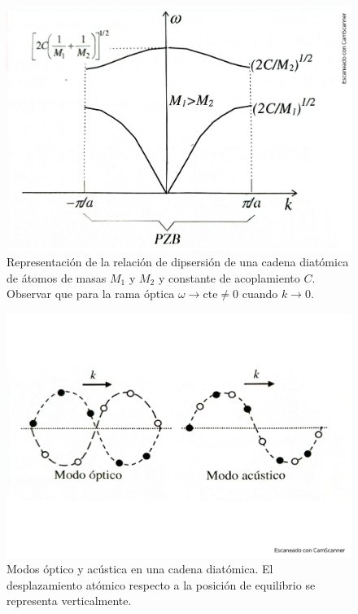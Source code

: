 \begin{figure}[h!] \centering
    \includegraphics[scale=0.5]{Cuerpo/Ch_04/Fotos libro 5.pdf}
    \caption{Representación de la relación de dipsersión de una cadena diatómica de átomos de masas $M_1$ y $M_2$ y constante de acoplamiento $C$. Observar que para la rama óptica $\omega \rightarrow \text{cte} \neq 0$ cuando $k\rightarrow 0$.}
    \label{Fig:04-05}
\end{figure}    

\begin{figure}[h!] \centering
    \includegraphics[scale=0.5]{Cuerpo/Ch_04/Fotos libro 6.pdf}
    \caption{Modos óptico y acústica en una cadena diatómica. El desplazamiento atómico respecto a la posición de equilibrio se representa verticalmente.}
    \label{Fig:04-06}
\end{figure}    

